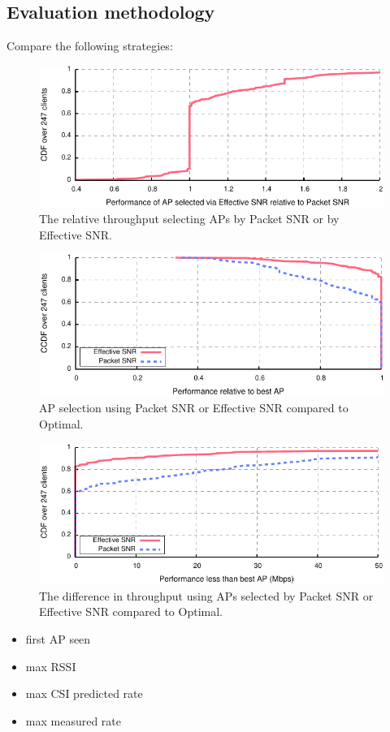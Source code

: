 \subsection{Evaluation methodology}
Compare the following strategies:
\begin{figure}[p]
	\centering
	\includegraphics[width=\textwidth]{figures/applications/ap_sel_ratio.pdf}
	\caption{\label{fig:ap_sel_ratio}The relative throughput selecting APs by Packet SNR or by Effective SNR\@.}
\end{figure}

\begin{figure}[p]
	\centering
	\includegraphics[width=\textwidth]{figures/applications/ap_sel_ratio_opt.pdf}
	\caption{\label{fig:ap_sel_ratio_opt}AP selection using Packet SNR or Effective SNR compared to Optimal.}
\end{figure}

\begin{figure}[p]
	\centering
	\includegraphics[width=\textwidth]{figures/applications/ap_sel_diff_opt.pdf}
	\caption{\label{fig:ap_sel_delta_opt}The difference in throughput using APs selected by Packet SNR or Effective SNR compared to Optimal.}
\end{figure}
\begin{itemize}
\item first AP seen
\item max RSSI
\item max CSI predicted rate
\item max measured rate
\end{itemize}